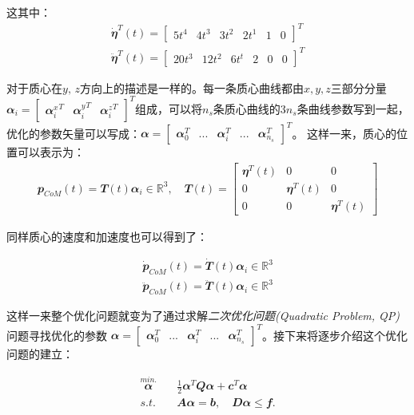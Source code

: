 这其中：
\begin{align}
\mathbfit{\dot \eta}^T(t) =  \begin{bmatrix}5t^4 & 4t^3 & 3t^2 & 2t^1 & 1 & 0\end{bmatrix}^T\\
\mathbfit{\ddot \eta}^T(t) =  \begin{bmatrix}20t^3 & 12t^2 & 6t^t & 2 & 0 & 0\end{bmatrix}^T
\end{align}

对于质心在$y,\, z$方向上的描述是一样的。每一条质心曲线都由$x,y,z$三部分分量${\mathbfit \alpha}_i = \begin{bmatrix}{{\mathbfit \alpha}_i^x}^T & {{\mathbfit \alpha}_i^y}^T & {{\mathbfit \alpha}_i^z}^T\end{bmatrix}^T$组成，可以将$n_s$条质心曲线的$3n_s$条曲线参数写到一起，优化的参数矢量可以写成：${\mathbfit \alpha} = \begin{bmatrix}{\mathbfit \alpha}_0^T & ...& {\mathbfit \alpha}_i^T &...& {\mathbfit \alpha}_{n_s}^T\end{bmatrix}^T$。
这样一来，质心的位置可以表示为：
\begin{align}
    {\mathbfit p}_{CoM}(t) = {\mathbfit T}(t){\mathbfit \alpha}_i \in{\mathbb R}^3
    , \quad
    {\mathbfit T}(t) = 
    \begin{bmatrix}
    {\mathbfit \eta}^T(t) & 0 & 0 \\
    0 & {\mathbfit \eta}^T(t) & 0 \\
    0 & 0 & {\mathbfit \eta}^T(t)
    \end{bmatrix}
\end{align}

同样质心的速度和加速度也可以得到了：

\begin{align}
    \dot {\mathbfit p}_{CoM}(t) = \dot {\mathbfit T}(t){\mathbfit \alpha}_i \in{\mathbb R}^3 \\
    \ddot {\mathbfit p}_{CoM}(t) = \ddot {\mathbfit T}(t){\mathbfit \alpha}_i \in{\mathbb R}^3
\end{align}

这样一来整个优化问题就变为了通过求解\emph{二次优化问题(Quadratic Problem, QP)}问题寻找优化的参数
${\mathbfit \alpha} = \begin{bmatrix}{\mathbfit \alpha}_0^T & ...& {\mathbfit \alpha}_i^T &...& {\mathbfit \alpha}_{n_s}^T\end{bmatrix}^T$。接下来将逐步介绍这个优化问题的建立：

\begin{align}
    \label{function:optimization_problem}
    \overset{min.}{\mathbfit{\alpha}} \quad & \frac{1}{2}\mathbfit{\alpha}^T \mathbfit{ Q \alpha} + \mathbfit{c}^T\mathbfit{\alpha} \\
    s.t. \quad & \mathbfit{A\alpha} = \mathbfit{ b}, \quad \mathbfit{D\alpha} \leq \mathbfit{f}. 
\end{align}

